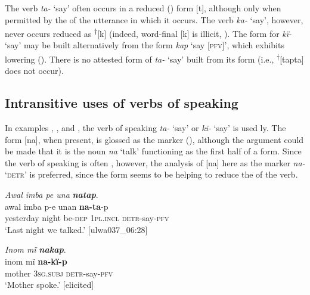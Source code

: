 The verb \textit{ta-} ‘say’ often occurs in a reduced () form [t], although only when permitted by the  of the utterance in which it occurs. The verb \textit{ka-} ‘say’, however, never occurs reduced as \textsuperscript{†}[k] (indeed, word-final [k] is illicit, ). The  form for \textit{kï-} ‘say’ may be built alternatively from the  form \textit{kap} ‘say [\textsc{pfv}]’, which exhibits  lowering (). There is no attested  form of \textit{ta-} ‘say’ built from its  form (i.e., \textsuperscript{†}[tapta] does not occur).


\subsection{Intransitive uses of verbs of speaking}\label{sec:13.4.1}


In examples , , and , the verb of speaking \textit{ta-} ‘say’ or \textit{kï-} ‘say’ is used ly. The form [na], when present, is glossed as the  marker (), although the argument could be made that it is the noun \textit{na} ‘talk’ functioning as the first half of a  form. Since the verb of speaking is often , however, the analysis of [na] here as the  marker \textit{na-} \textsc{‘detr’} is preferred, since the form seems to be helping to  reduce the  of the verb.


\ea%
    \label{ex:syntax:180}
          \textit{Awal imba pe una} \textbf{\textit{natap}}.\\
\gll awal    imba  p-e    unan    \textbf{na-ta}{}-p\\
    yesterday  night  be\textsc{{}-dep}  \textsc{1pl.incl}  \textsc{detr-}say-\textsc{pfv}\\
\glt `Last night we talked.’ [ulwa037\_06:28]
\z

\ea%
    \label{ex:syntax:181}
          \textit{Inom mï} \textbf{\textit{nakap}}.\\
\gll inom  mï      \textbf{na-kï-p}\\
    mother  \textsc{3sg.subj}  \textsc{detr-}say-\textsc{pfv}\\
\glt `Mother spoke.’ [elicited]
\z

